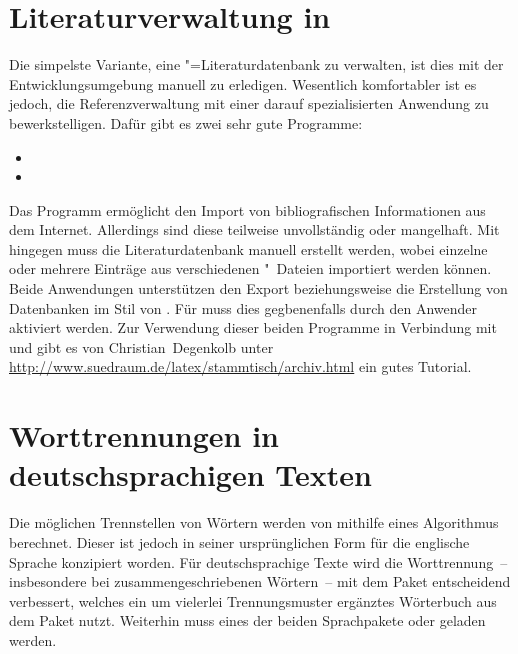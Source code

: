 \section{%
  Literaturverwaltung in %
}
%
%
Die simpelste Variante, eine "=Literaturdatenbank zu verwalten, 
ist dies mit der Entwicklungsumgebung manuell zu erledigen. Wesentlich 
komfortabler ist es jedoch, die Referenzverwaltung mit einer darauf 
spezialisierten Anwendung zu bewerkstelligen. Dafür gibt es zwei sehr gute 
Programme:
%
\begin{itemize}
\item {}
\item {}
\end{itemize}
%
Das Programm  ermöglicht den Import von bibliografischen 
Informationen aus dem Internet. Allerdings sind diese teilweise unvollständig 
oder mangelhaft. Mit  hingegen muss die Literaturdatenbank 
manuell erstellt werden, wobei einzelne oder mehrere Einträge aus verschiedenen
"~Dateien importiert werden können. Beide Anwendungen unterstützen 
den Export beziehungsweise die Erstellung von Datenbanken im Stil von 
. Für  muss dies gegbenenfalls durch den 
Anwender aktiviert werden. Zur Verwendung dieser beiden Programme in Verbindung 
mit  und  gibt es von Christian~Degenkolb 
unter \mbox{\url{http://www.suedraum.de/latex/stammtisch/archiv.html}} ein 
gutes Tutorial.



\section{%
  Worttrennungen in deutschsprachigen Texten%
  \label{sec:tips:hyphenation}%
}
%
%
Die möglichen Trennstellen von Wörtern werden von  mithilfe 
eines Algorithmus berechnet. Dieser ist jedoch in seiner ursprünglichen Form 
für die englische Sprache konzipiert worden. Für deutschsprachige Texte wird 
die Worttrennung~-- insbesondere bei zusammengeschriebenen Wörtern~-- mit dem 
Paket  entscheidend verbessert, welches ein um vielerlei 
Trennungsmuster ergänztes Wörterbuch aus dem Paket  
nutzt. Weiterhin muss eines der beiden Sprachpakete  oder
 geladen werden. 


